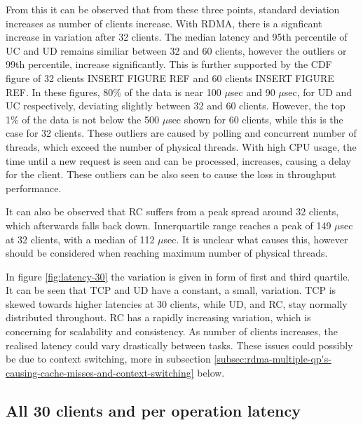 From this it can be observed that from these three points, standard deviation increases as number of clients increase.
With RDMA, there is a signficant increase in variation after 32 clients.
The median latency and 95th percentile of UC and UD remains similiar between 32 and 60 clients, however the outliers or 99th percentile, increase significantly.
This is further supported by the CDF figure of 32 clients INSERT FIGURE REF and 60 clients INSERT FIGURE REF.
In these figures, 80\% of the data is near 100 $\mu$sec and 90 $\mu$sec, for UD and UC respectively, deviating slightly between 32 and 60 clients.
However, the top 1\% of the data is not below the 500 $\mu$sec shown for 60 clients, while this is the case for 32 clients.
These outliers are caused by polling and concurrent number of threads, which exceed the number of physical threads.
With high CPU usage, the time until a new request is seen and can be processed, increases, causing a delay for the client.
These outliers can be also seen to cause the loss in throughput performance.

It can also be observed that RC suffers from a peak spread around 32 clients, which afterwards falls back down.
Innerquartile range reaches a peak of 149 $\mu$sec at 32 clients, with a median of 112 $\mu$sec.
It is unclear what causes this, however should be considered when reaching maximum number of physical threads.



In figure \ref{fig:latency-30} the variation is given in form of first and third quartile.
It can be seen that TCP and UD have a constant, a small, variation.
TCP is skewed towards higher latencies at 30 clients, while UD, and RC, stay normally distributed throughout.
RC has a rapidly increasing variation, which is concerning for scalability and consistency.
As number of clients increases, the realised latency could vary drastically between tasks.
These issues could possibly be due to context switching, more in subsection \ref{subsec:rdma-multiple-qp's-causing-cache-misses-and-context-switching} below.

\subsection{All 30 clients and per operation latency}\label{subsec:all-30-clients-and-per-operation-latency}

